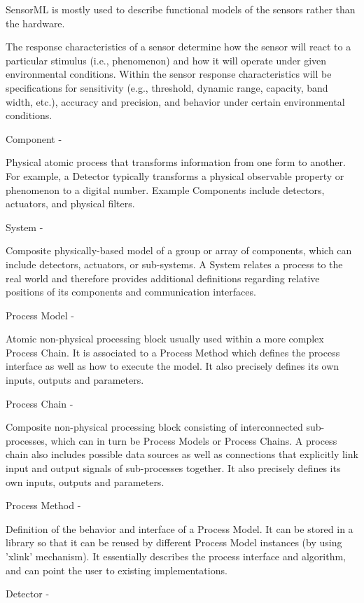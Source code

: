 \documentclass[]{final_report}
\begin{document}
SensorML is mostly used to describe functional models of the sensors rather than the hardware.

The response characteristics of a sensor determine how the sensor will react to a particular stimulus (i.e., phenomenon) and how it will operate under given environmental conditions. Within the sensor response characteristics will be specifications for sensitivity (e.g., threshold, dynamic range, capacity, band width, etc.), accuracy and precision, and behavior under certain environmental conditions.

    Component -

    Physical atomic process that transforms information from one form to another. For example, a Detector typically transforms a physical observable property or phenomenon to a digital number. Example Components include detectors, actuators, and physical filters.

    System -

    Composite physically-based model of a group or array of components, which can include detectors, actuators, or sub-systems. A System relates a process to the real world and therefore provides additional definitions regarding relative positions of its components and communication interfaces.

    Process Model -

    Atomic non-physical processing block usually used within a more complex Process Chain. It is associated to a Process Method which defines the process interface as well as how to execute the model. It also precisely defines its own inputs, outputs and parameters.

    Process Chain -

    Composite non-physical processing block consisting of interconnected sub-processes, which can in turn be Process Models or Process Chains. A process chain also includes possible data sources as well as connections that explicitly link input and output signals of sub-processes together. It also precisely defines its own inputs, outputs and parameters.

    Process Method -

    Definition of the behavior and interface of a Process Model. It can be stored in a library so that it can be reused by different Process Model instances (by using 'xlink' mechanism). It essentially describes the process interface and algorithm, and can point the user to existing implementations.

    Detector -
\end{document}
